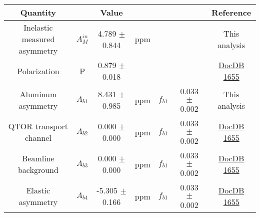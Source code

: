 \documentclass[xcolor=x11names,compress,8pt]{beamer}
\renewcommand{\(}{\begin{columns}}
\renewcommand{\)}{\end{columns}}
\newcommand{\<}[1]{\begin{column}{#1}}
\renewcommand{\>}{\end{column}}
\begin{document}
\begin{table}[h]
\begin{center}
  \begin{tabular}{ c  c  c  c  c  c  c }
    \hline
    Quantity 		&	&	Value	&	&	& &  Reference		\\
	\hline
	Inelastic measured asymmetry & $A^{in}_{M}$ &	4.789 $\pm$ 0.844 & ppm & & & This analysis\\

	Polarization & P & 	0.879 $\pm$ 0.018 & &	& & \href{https://qweak.jlab.org/doc-private/ShowDocument?docid=1655}{DocDB 1655} \cite{buddhini_transverse_technote}	\\

	Aluminum asymmetry & $A_{b1}$ & 8.431 $\pm$ 0.985 & ppm & $f_{b1}$ & 0.033 $\pm$ 0.002 &	This analysis\\
	


	QTOR transport channel & $A_{b2}$ & 0.000 $\pm$ 0.000 & ppm	& $f_{b1}$ & 0.033 $\pm$ 0.002 & \href{https://qweak.jlab.org/doc-private/ShowDocument?docid=1655}{DocDB 1655} \cite{buddhini_transverse_technote}	\\
	

	Beamline background & $A_{b3}$ & 0.000 $\pm$ 0.000 & ppm	& $f_{b1}$ & 0.033 $\pm$ 0.002 & 	\href{https://qweak.jlab.org/doc-private/ShowDocument?docid=1655}{DocDB 1655} \cite{buddhini_transverse_technote}	\\
	
	
	Elastic asymmetry & $A_{b4}$ & -5.305 $\pm$ 0.166 & ppm	& $f_{b1}$ & 0.033 $\pm$ 0.002 &	\href{https://qweak.jlab.org/doc-private/ShowDocument?docid=1655}{DocDB 1655} \cite{buddhini_transverse_technote}	\\
	

\end{tabular}
\end{center}
\end{table}
\end{document}
